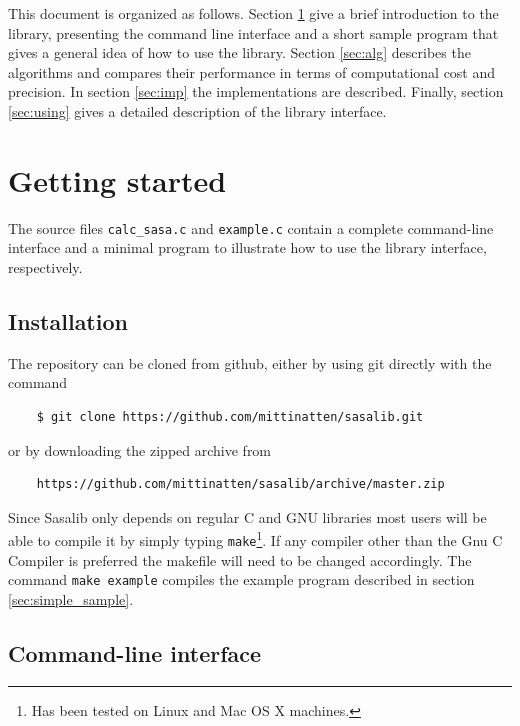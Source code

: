 \documentclass[a4paper,11pt]{article}
\begin{document}
This document is organized as follows. Section \ref{sec:howto_short}
give a brief introduction to the library, presenting the command line
interface and a short sample program that gives a general idea of how
to use the library. Section \ref{sec:alg} describes the algorithms and
compares their performance in terms of computational cost and
precision. In section \ref{sec:imp} the implementations are
described. Finally, section \ref{sec:using} gives a detailed
description of the library interface.

\section{Getting started}\label{sec:howto_short}

The source files \texttt{calc\_sasa.c} and \texttt{example.c} contain
a complete command-line interface and a minimal program to illustrate
how to use the library interface, respectively. 

\subsection{Installation} \label{sec:installing}

The repository can be cloned from github, either by using git directly
with the command
\begin{verbatim}
    $ git clone https://github.com/mittinatten/sasalib.git
\end{verbatim}
or by downloading the zipped archive from
\begin{verbatim}
    https://github.com/mittinatten/sasalib/archive/master.zip
\end{verbatim}
Since Sasalib only depends on regular C and GNU libraries most users
will be able to compile it by simply typing \texttt{make}\footnote{Has
  been tested on Linux and Mac OS X machines.}. If any compiler other
than the Gnu C Compiler is preferred the makefile will need to be
changed accordingly. The command \texttt{make example} compiles the
example program described in section \ref{sec:simple_sample}.

\subsection{Command-line interface}
\end{document}
